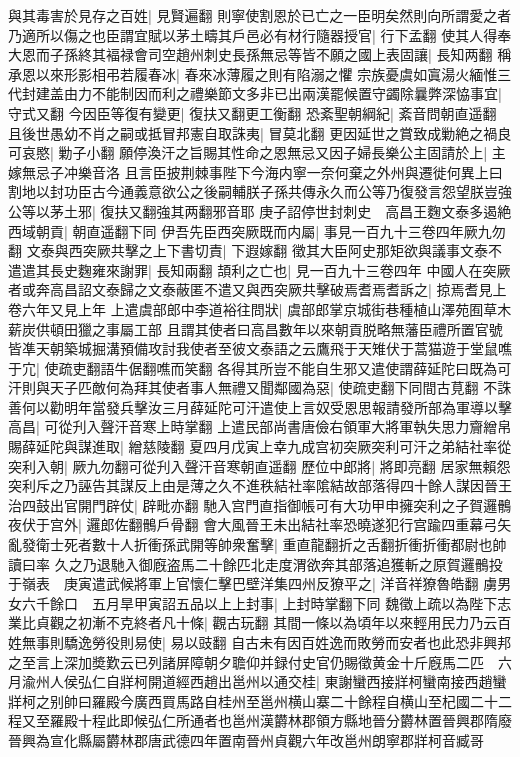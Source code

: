 與其毒害於見存之百姓|{
	見賢遍翻}
則寧使割恩於已亡之一臣明矣然則向所謂愛之者乃適所以傷之也臣謂宜賦以茅土疇其戶邑必有材行隨器授官|{
	行下孟翻}
使其人得奉大恩而子孫終其褔禄會司空趙州刺史長孫無忌等皆不願之國上表固讓|{
	長知两翻}
稱承恩以來形影相弔若履春冰|{
	春來冰薄履之則有陷溺之懼}
宗族憂虞如寘湯火緬惟三代封建盖由力不能制因而利之禮樂節文多非已出兩漢罷候置守蠲除曩弊深恊事宜|{
	守式又翻}
今因臣等復有變更|{
	復扶又翻更工衡翻}
恐紊聖朝綱紀|{
	紊音問朝直遥翻}
且後世愚幼不肖之嗣或抵冒邦憲自取誅夷|{
	冒莫北翻}
更因延世之賞致成勦絶之禍良可哀愍|{
	勦子小翻}
願停渙汗之旨賜其性命之恩無忌又因子婦長樂公主固請於上|{
	主嫁無忌子冲樂音洛}
且言臣披荆棘事陛下今海内寧一奈何棄之外州與遷徙何異上曰割地以封功臣古今通義意欲公之後嗣輔朕子孫共傳永久而公等乃復發言怨望朕豈強公等以茅土邪|{
	復扶又翻強其两翻邪音耶}
庚子詔停世封刺史　高昌王麴文泰多遏絶西域朝貢|{
	朝直遥翻下同}
伊吾先臣西突厥既而内屬|{
	事見一百九十三卷四年厥九勿翻}
文泰與西突厥共擊之上下書切責|{
	下遐嫁翻}
徵其大臣阿史那矩欲與議事文泰不遣遣其長史麴雍來謝罪|{
	長知兩翻}
頡利之亡也|{
	見一百九十三卷四年}
中國人在突厥者或奔高昌詔文泰歸之文泰蔽匿不遣又與西突厥共擊破焉耆焉耆訴之|{
	掠焉耆見上卷六年又見上年}
上遣虞部郎中李道裕往問狀|{
	虞部郎掌京城街巷種植山澤苑囿草木薪炭供頓田獵之事屬工部}
且謂其使者曰高昌數年以來朝貢脱略無藩臣禮所置官號皆凖天朝築城掘溝預備攻討我使者至彼文泰語之云鷹飛于天雉伏于蒿猫遊于堂鼠噍于宂|{
	使疏吏翻語牛倨翻噍而笑翻}
各得其所豈不能自生邪又遣使謂薛延陀曰既為可汗則與天子匹敵何為拜其使者事人無禮又聞鄰國為惡|{
	使疏吏翻下同間古莧翻}
不誅善何以勸明年當發兵擊汝三月薛延陀可汗遣使上言奴受恩思報請發所部為軍導以擊高昌|{
	可從刋入聲汗音寒上時掌翻}
上遣民部尚書唐儉右領軍大將軍執失思力齎繒帛賜薛延陀與謀進取|{
	繒慈陵翻}
夏四月戊寅上幸九成宫初突厥突利可汗之弟結社率從突利入朝|{
	厥九勿翻可從刋入聲汗音寒朝直遥翻}
歷位中郎將|{
	將即亮翻}
居家無賴怨突利斥之乃誣告其謀反上由是薄之久不進秩結社率隂結故部落得四十餘人謀因晉王治四鼓出官開門辟仗|{
	辟毗亦翻}
馳入宫門直指御帳可有大功甲申擁突利之子賀邏鶻夜伏于宫外|{
	邏郎佐翻鶻戶骨翻}
會大風晉王未出結社率恐曉遂犯行宫踰四重幕弓矢亂發衛士死者數十人折衝孫武開等帥衆奮擊|{
	重直龍翻折之舌翻折衝折衝都尉也帥讀曰率}
久之乃退馳入御廐盗馬二十餘匹北走度渭欲奔其部落追獲斬之原賀邏鶻投于嶺表　庚寅遣武候將軍上官懷仁擊巴壁洋集四州反獠平之|{
	洋音祥獠魯皓翻}
虜男女六千餘口　五月旱甲寅詔五品以上上封事|{
	上封時掌翻下同}
魏徵上疏以為陛下志業比貞觀之初漸不克終者凡十條|{
	觀古玩翻}
其間一條以為頃年以來輕用民力乃云百姓無事則驕逸勞役則易使|{
	易以豉翻}
自古未有因百姓逸而敗勞而安者也此恐非興邦之至言上深加奬歎云已列諸屏障朝夕聸仰并録付史官仍賜徵黄金十斤廐馬二匹　六月渝州人侯弘仁自牂柯開道經西趙出邕州以通交桂|{
	東謝蠻西接牂柯蠻南接西趙蠻牂柯之别帥曰羅殿今廣西買馬路自桂州至邕州横山寨二十餘程自横山至杞國二十二程又至羅殿十程此即候弘仁所通者也邕州漢欝林郡領方縣地晉分欝林置晉興郡隋廢晉興為宣化縣屬欝林郡唐武德四年置南晉州貞觀六年改邕州朗寧郡牂柯音臧哥}
